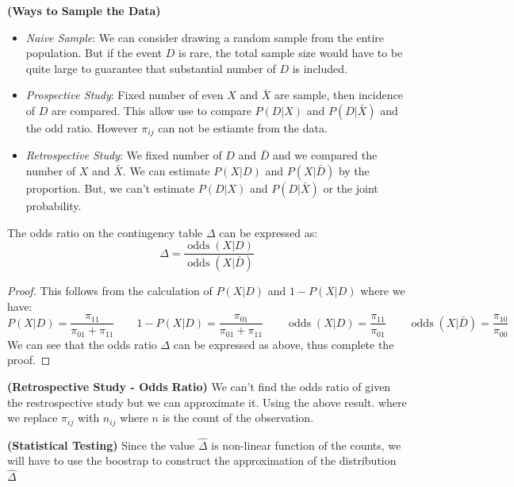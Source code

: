 \begin{remark}{\textbf{(Ways to Sample the Data)}}
    \begin{itemize}
        \item \emph{Naive Sample}: We can consider drawing a random sample from the entire population. But if the event $D$ is rare, the total sample size would have to be quite large to guarantee that substantial number of $D$ is included. 
        \item \emph{Prospective Study}: Fixed number of even $X$ and $\bar{X}$ are sample, then incidence of $D$ are compared. This allow use to compare $P(D|X)$ and $P(D|\bar{X})$ and the odd ratio. However $\pi_{ij}$ can not be estiamte from the data. 
        \item \emph{Retrospective Study}: We fixed number of $D$ and $\bar{D}$ and we compared the number of $X$ and $\bar{X}$. We can estimate $P(X|D)$ and $P(X|\bar{D})$ by the proportion. But, we can't estimate $P(D|X)$ and $P(D|\bar{X})$ or the joint probability.
    \end{itemize}
\end{remark}

\begin{proposition}
    The odds ratio on the contingency table $\Delta$ can be expressed as:
    \begin{equation*}
        \Delta = \frac{\operatorname{odds}(X | D)}{\operatorname{odds}(X|\bar{D})}
    \end{equation*}
\end{proposition}
\begin{proof}
    This follows from the calculation of $P(X|D)$ and $1-P(X|D)$ where we have:
    \begin{equation*}
        P(X | D) = \frac{\pi_{11}}{\pi_{01} + \pi_{11}} \qquad 1 - P(X|D) = \frac{\pi_{01}}{\pi_{01} + \pi_{11}} \qquad \operatorname{odds}(X |D) = \frac{\pi_{11}}{\pi_{01}} \qquad \operatorname{odds}(X | \bar{D}) = \frac{\pi_{10}}{\pi_{00}}
    \end{equation*}
    We can see that the odds ratio $\Delta$ can be expressed as above, thus complete the proof.
\end{proof}

\begin{remark}{\textbf{(Retrospective Study - Odds Ratio)}}
    We can't find the odds ratio of given the restrospective study but we can approximate it. Using the above result. where we replace $\pi_{ij}$ with $n_{ij}$ where $n$ is the count of the observation. 
\end{remark}

\begin{remark}{\textbf{(Statistical Testing)}}
    Since the value $\hat{\Delta}$ is non-linear function of the counts, we will have to use the boostrap to construct the approximation of the distribution $\hat{\Delta}$
\end{remark}

